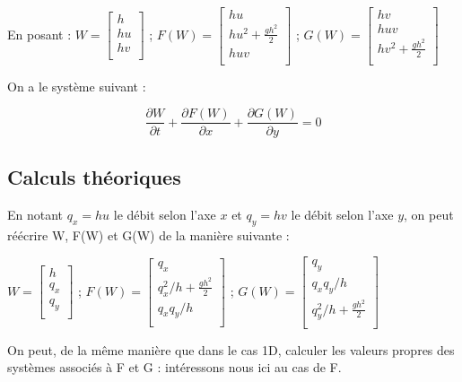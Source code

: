 \documentclass[
11pt, %
francais, %
singlespacing, %
headsepline, %
]{MastersDoctoralThesis} %
\theoremstyle{definition}
\begin{document}
En posant : 
$ W = \left[ {\begin{array}{c}   h \\    hu \\    hv \\  \end{array} } \right] $ ; 
$ F(W) = \left[ {\begin{array}{c}   hu \\    hu^2 + \frac{gh^2}{2}  \\    huv  \\  \end{array} } \right] $ ;
$ G(W) = \left[ {\begin{array}{c}   hv \\    huv  \\    hv^2 + \frac{gh^2}{2} \\  \end{array} } \right] $

On a le système suivant :

$$ \frac{\partial W}{\partial t} + \frac{\partial F(W)}{\partial x} + \frac{\partial G(W)}{\partial y} = 0 $$

\subsection{Calculs théoriques}

En notant $q_x = hu$ le débit selon l'axe $x$ et $q_y = hv$ le débit selon l'axe $y$, on peut réécrire W, F(W) et G(W) de la manière suivante :

$ W = \left[ {\begin{array}{c}   h \\    q_x \\    q_y \\  \end{array} } \right] $ ; 
$ F(W) = \left[ {\begin{array}{c}   q_x \\    q_x^2/h + \frac{gh^2}{2}  \\    q_xq_y/h  \\  \end{array} } \right] $ ;
$ G(W) = \left[ {\begin{array}{c}   q_y \\    q_xq_y/h   \\    q_y^2/h + \frac{gh^2}{2} \\  \end{array} } \right] $

On peut, de la même manière que dans le cas 1D, calculer les valeurs propres des systèmes associés à F et G : intéressons nous ici au cas de F.
\end{document}
